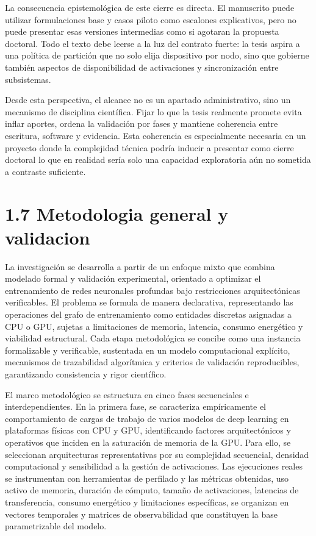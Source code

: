 La consecuencia epistemológica de este cierre es directa. El manuscrito puede utilizar formulaciones base y casos piloto como escalones explicativos, pero no puede presentar esas versiones intermedias como si agotaran la propuesta doctoral. Todo el texto debe leerse a la luz del contrato fuerte: la tesis aspira a una política de partición que no solo elija dispositivo por nodo, sino que gobierne también aspectos de disponibilidad de activaciones y sincronización entre subsistemas.

Desde esta perspectiva, el alcance no es un apartado administrativo, sino un mecanismo de disciplina científica. Fijar lo que la tesis realmente promete evita inflar aportes, ordena la validación por fases y mantiene coherencia entre escritura, software y evidencia. Esta coherencia es especialmente necesaria en un proyecto donde la complejidad técnica podría inducir a presentar como cierre doctoral lo que en realidad sería solo una capacidad exploratoria aún no sometida a contraste suficiente.

\section{1.7 Metodologia general y validacion}
La investigación se desarrolla a partir de un enfoque mixto que combina modelado formal y validación experimental, orientado a optimizar el entrenamiento de redes neuronales profundas bajo restricciones arquitectónicas verificables. El problema se formula de manera declarativa, representando las operaciones del grafo de entrenamiento como entidades discretas asignadas a CPU o GPU, sujetas a limitaciones de memoria, latencia, consumo energético y viabilidad estructural. Cada etapa metodológica se concibe como una instancia formalizable y verificable, sustentada en un modelo computacional explícito, mecanismos de trazabilidad algorítmica y criterios de validación reproducibles, garantizando consistencia y rigor científico.

El marco metodológico se estructura en cinco fases secuenciales e interdependientes. En la primera fase, se caracteriza empíricamente el comportamiento de cargas de trabajo de varios modelos de deep learning en plataformas físicas con CPU y GPU, identificando factores arquitectónicos y operativos que inciden en la saturación de memoria de la GPU. Para ello, se seleccionan arquitecturas representativas por su complejidad secuencial, densidad computacional y sensibilidad a la gestión de activaciones. Las ejecuciones reales se instrumentan con herramientas de perfilado y las métricas obtenidas, uso activo de memoria, duración de cómputo, tamaño de activaciones, latencias de transferencia, consumo energético y limitaciones específicas, se organizan en vectores temporales y matrices de observabilidad que constituyen la base parametrizable del modelo.

